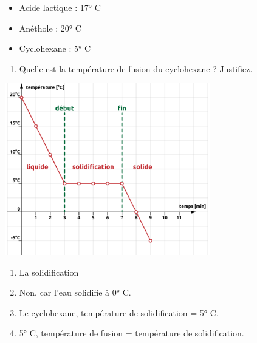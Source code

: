 \documentclass[
  11pt,
  a4paper,
  openany]{book}
\providecommand{\tightlist}{%
  \setlength{\itemsep}{0pt}\setlength{\parskip}{0pt}}
\begin{document}
\begin{Exercise}
\begin{itemize}
\tightlist
\item
  Acide lactique : 17° C
\item
  Anéthole : 20° C
\item
  Cyclohexane : 5° C
\end{itemize}

\begin{enumerate}
\def\labelenumi{\arabic{enumi}.}
\setcounter{enumi}{5}
\tightlist
\item
  Quelle est la température de fusion du cyclohexane ? Justifiez.\\
\end{enumerate}

\end{Exercise}

\begin{Answer}

\begin{center}
\includegraphics[width=0.67\textwidth,height=\textheight]{images/graph-cyclohexane-corr.png}

\end{center}

\begin{enumerate}
\def\labelenumi{\arabic{enumi}.}
\setcounter{enumi}{1}
\tightlist
\item
  La solidification
\item
  Non, car l'eau solidifie à 0° C.
\item
  Le cyclohexane, température de solidification = 5° C.
\item
  5° C, température de fusion = température de solidification.
\end{enumerate}

\end{Answer}
\end{document}
